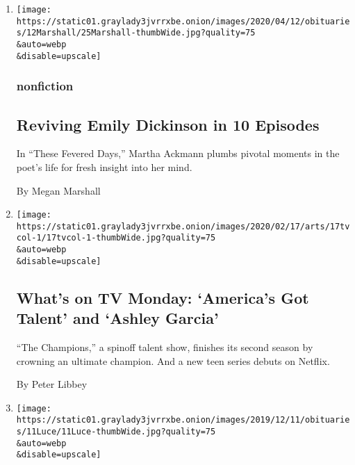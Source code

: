 \begin{enumerate}
\def\labelenumi{\arabic{enumi}.}
\item
  \href{/2020/02/25/books/review/these-fevered-days-martha-ackmann.html}{}

  \texttt{[image: https://static01.graylady3jvrrxbe.onion/images/2020/04/12/obituaries/12Marshall/25Marshall-thumbWide.jpg?quality=75\\\&auto=webp\\\&disable=upscale]}

  \hypertarget{nonfiction}{%
  \subsubsection{nonfiction}\label{nonfiction}}

  \hypertarget{reviving-emily-dickinson-in-10-episodes}{%
  \subsection{Reviving Emily Dickinson in 10
  Episodes}\label{reviving-emily-dickinson-in-10-episodes}}

  In ``These Fevered Days,'' Martha Ackmann plumbs pivotal moments in
  the poet's life for fresh insight into her mind.

  By Megan Marshall
\item
  \href{/2020/02/17/arts/television/whats-on-tv-monday-americas-got-talent-and-ashley-garcia.html}{}

  \texttt{[image: https://static01.graylady3jvrrxbe.onion/images/2020/02/17/arts/17tvcol-1/17tvcol-1-thumbWide.jpg?quality=75\\\&auto=webp\\\&disable=upscale]}

  \hypertarget{whats-on-tv-monday-americas-got-talent-and-ashley-garcia}{%
  \subsection{What's on TV Monday: `America's Got Talent' and `Ashley
  Garcia'}\label{whats-on-tv-monday-americas-got-talent-and-ashley-garcia}}

  ``The Champions,'' a spinoff talent show, finishes its second season
  by crowning an ultimate champion. And a new teen series debuts on
  Netflix.

  By Peter Libbey
\item
  \href{/2019/12/12/theater/william-luce-dead.html}{}

  \texttt{[image: https://static01.graylady3jvrrxbe.onion/images/2019/12/11/obituaries/11Luce/11Luce-thumbWide.jpg?quality=75\\\&auto=webp\\\&disable=upscale]}


\end{enumerate}
